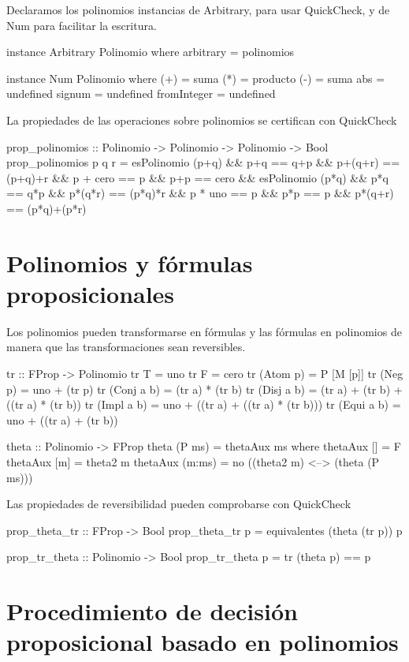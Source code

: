 \documentclass{llncs}
\begin{document}
Declaramos los polinomios instancias de Arbitrary, para usar QuickCheck, y de
Num para facilitar la escritura.
\begin{code}
instance Arbitrary Polinomio where
    arbitrary = polinomios

instance Num Polinomio where
    (+) = suma 
    (*) = producto
    (-) = suma
    abs = undefined
    signum = undefined
    fromInteger = undefined
\end{code}

La propiedades de las operaciones sobre polinomios se certifican con QuickCheck
\begin{code}
prop_polinomios :: Polinomio -> Polinomio -> Polinomio -> Bool
prop_polinomios p q r =
   esPolinomio (p+q)       &&
   p+q == q+p              &&
   p+(q+r) == (p+q)+r      &&  
   p + cero == p           &&
   p+p == cero             &&
   esPolinomio (p*q)       &&
   p*q == q*p              &&
   p*(q*r) == (p*q)*r      &&  
   p * uno == p            &&
   p*p == p                &&
   p*(q+r) == (p*q)+(p*r)
\end{code}

\section{Polinomios y fórmulas proposicionales}

Los polinomios pueden transformarse en fórmulas y las fórmulas en polinomios
de manera que las transformaciones sean reversibles.
\begin{code}
tr :: FProp -> Polinomio
tr T          = uno
tr F          = cero
tr (Atom p)   = P [M [p]]
tr (Neg p)    = uno + (tr p)
tr (Conj a b) = (tr a) * (tr b)
tr (Disj a b) = (tr a) + (tr b) + ((tr a) * (tr b))
tr (Impl a b) = uno + ((tr a) + ((tr a) * (tr b)))
tr (Equi a b) = uno + ((tr a) + (tr b))

theta :: Polinomio -> FProp
theta (P ms) = thetaAux ms
   where thetaAux []     = F
         thetaAux [m]    = theta2 m
         thetaAux (m:ms) = no ((theta2 m) <--> (theta (P ms)))
\end{code}

Las propiedades de reversibilidad pueden comprobarse con QuickCheck
\begin{code}
prop_theta_tr :: FProp -> Bool
prop_theta_tr p = equivalentes (theta (tr p)) p

prop_tr_theta :: Polinomio -> Bool
prop_tr_theta p = tr (theta p) == p
\end{code}

\section{Procedimiento de decisión proposicional basado en polinomios}
\end{document}
